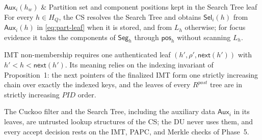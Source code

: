 $\mathsf{Aux}_i(h_w)$ & Partition set and component positions kept in the Search Tree leaf \\

For every $h \in H_Q$, the CS resolves the Search Tree and obtains $\mathsf{Sel}_i(h)$ from
$\mathsf{Aux}_i(h)$ in \eqref{eq:part-leaf} when it is stored, and from $L_h$ otherwise; for
focus evidence it takes the components of $\mathsf{Seg}_h$ through $\mathsf{pos}_h$ without
scanning $L_h$.




IMT non-membership requires one authenticated leaf $(h', \rho', \mathsf{next}(h'))$ with
$h' < h < \mathsf{next}(h')$. Its meaning relies on the indexing invariant of Proposition~1: the next
pointers of the finalized IMT form one strictly increasing chain over exactly the indexed keys, and the
leaves of every $R^{post}$ tree are in strictly increasing $PID$ order.

The Cuckoo filter and the Search Tree, including the auxiliary data $\mathsf{Aux}_i$ in its leaves,
are untrusted lookup structures of the CS; the DU never uses them, and every accept decision rests on the IMT, PAPC,
and Merkle checks of Phase~5.



